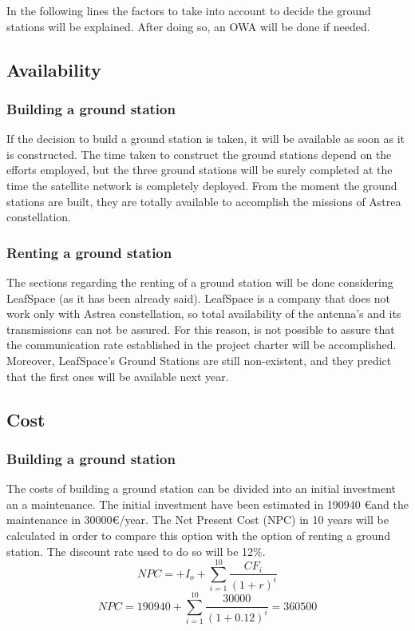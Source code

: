In the following lines the factors to take into account to decide the ground stations will be explained. After doing so, an OWA will be done if needed.

\subsection{Availability}

\subsubsection{Building a ground station}
If the decision to build a ground station is taken, it will be available as soon as it is constructed. The time taken to construct the ground stations depend on the efforts employed, but the three ground stations will be surely completed at the time the satellite network is completely deployed. From the moment the ground stations are built, they are totally available to accomplish the missions of Astrea constellation.

\subsubsection{Renting a ground station}
The sections regarding the renting of a ground station will be done considering LeafSpace (as it has been already said). LeafSpace is a company that does not work only with Astrea constellation, so total availability of the antenna's and its transmissions can not be assured. For this reason, is not possible to assure that the communication rate established in the project charter will be accomplished. Moreover, LeafSpace's Ground Stations are still non-existent, and they predict that the first ones will be available next year.

\subsection{Cost}

\subsubsection{Building a ground station}
The costs of building a ground station can be divided into an initial investment an a maintenance. The initial investment have been estimated in 190940 \euro and the maintenance in 30000\euro /year. The Net Present Cost (NPC) in 10 years will be calculated in order to compare this option with the option of renting a ground station. The discount rate used to do so will be 12\%.
\begin{equation}
NPC=+I_{o}+\sum_{i=1}^{10} \frac{CF_{i}}{(1+r)^i}
\end{equation}
\begin{equation}
NPC=190940+\sum_{i=1}^{10} \frac{30000}{(1+0.12)^i}=360500
\end{equation}

